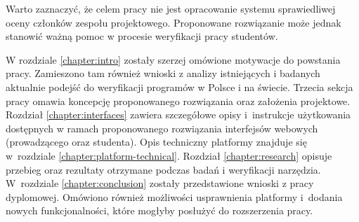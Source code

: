 Warto zaznaczyć, że celem pracy nie jest opracowanie systemu sprawiedliwej oceny członków zespołu projektowego.
Proponowane rozwiązanie może jednak stanowić ważną pomoc w procesie weryfikacji pracy studentów.

W rozdziale \ref{chapter:intro} zostały szerzej omówione motywacje do powstania pracy.
Zamieszono tam również wnioski z analizy istniejących i badanych aktualnie podejść do weryfikacji programów w Polsce i na świecie.
Trzecia sekcja pracy omawia koncepcję proponowanego rozwiązania oraz założenia projektowe.
Rozdział \ref{chapter:interfaces} zawiera szczegółowe opisy i~instrukcje użytkowania dostępnych w ramach proponowanego rozwiązania interfejsów webowych (prowadzącego oraz studenta).
Opis techniczny platformy znajduje się w~rozdziale \ref{chapter:platform-technical}.
Rozdział \ref{chapter:research} opisuje przebieg oraz rezultaty otrzymane podczas badań i weryfikacji narzędzia.
W~rozdziale \ref{chapter:conclusion} zostały przedstawione wnioski z pracy dyplomowej.
Omówiono również możliwości usprawnienia platformy i~dodania nowych funkcjonalności, które mogłyby posłużyć do rozszerzenia pracy.





